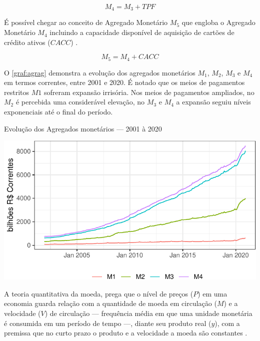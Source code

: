 \documentclass[
  12pt,
  12pt,
  openright,
  oneside,
  a4paper,
  chapter=TITLE,
  section=TITLE,
  subsection=TITLE,
  subsubsection=TITLE,
  english,
  portugues,
  sumario=tradicional]{abntex2}
\begin{document}
\begin{equation}
M_4 = M_3 + TPF
\end{equation}

É possível chegar ao conceito de Agregado Monetário \(M_5\) que engloba o Agregado Monetário \(M_4\) incluindo a capacidade disponível de aquisição de cartões de crédito ativos (\(CACC\)) \cite{cordoba:1996}.

\begin{equation}
M_5 = M_4 + CACC
\end{equation}

O \autoref{graf:agrag} demonstra a evolução dos agregados monetários \(M_1\), \(M_2\), \(M_3\) e \(M_4\) em termos correntes, entre 2001 e 2020. É notado que os meios de pagamentos restritos \(M1\) sofreram expansão irrisória. Nos meios de pagamentos ampliados, no \(M_2\) é percebida uma considerável elevação, no \(M_3\) e \(M_4\) a expansão seguiu níveis exponenciais até o final do período.

\begin{grafico}[!hbtp]
\vspace{20pt}
\caption{Evolução dos Agregados monetários — 2001 à 2020}
\vspace{-4mm}

\begin{center}\includegraphics{12-exportedfigures/m2m3m4-1} \end{center}
\vspace{-3mm}
\label{graf:agrag}
\vspace{-2mm}
\end{grafico}

A teoria quantitativa da moeda, prega que o nível de preços (\(P\)) em uma economia guarda relação com a quantidade de moeda em circulação (\(M\)) e a velocidade (\(V\)) de circulação --- frequência média em que uma unidade monetária é consumida em um período de tempo ---, diante seu produto real (\(y\)), com a premissa que no curto prazo o produto e a velocidade a moeda são constantes \cite{vasconcellos:2011}.
\end{document}
